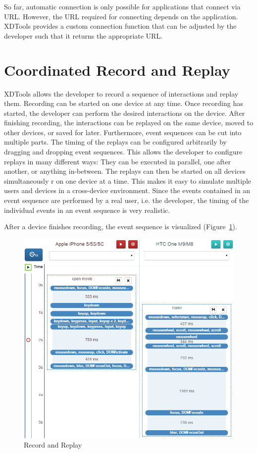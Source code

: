 So far, automatic connection is only possible for applications that connect via URL. However, the URL required for connecting depends on the application. XDTools provides a custom connection function that can be adjusted by the developer such that it returns the appropriate URL.

\section{Coordinated Record and Replay}

XDTools allows the developer to record a sequence of interactions and replay them. Recording can be started on one device at any time. Once recording has started, the developer can perform the desired interactions on the device. After finishing recording, the interactions can be replayed on the same device, moved to other devices, or saved for later.  Furthermore, event sequences can be cut into multiple parts. The timing of the replays can be configured arbitrarily by dragging and dropping event sequences. This allows the developer to configure replays in many different ways: They can be executed in parallel, one after another, or anything in-between. The replays can then be started on all devices simultaneously r on one device at a time. This makes it easy to simulate multiple users and devices in a cross-device environment. Since the events contained in an event sequence are performed by a real user, i.e. the developer, the timing of the individual events in an event sequence is very realistic.

After a device finishes recording, the event sequence is visualized (Figure~\ref{fig:record_replay}).

\begin{figure}[H]
  \centering
    \includegraphics[width=1.0\textwidth]{images/screenshots/record_replay_2.png}
	\caption[Screenshot: Record and replay]{Record and Replay}
	\label{fig:record_replay}
\end{figure}

